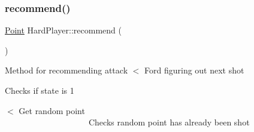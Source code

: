 \subsubsection{\texorpdfstring{recommend()}{recommend()}}
{\footnotesize\ttfamily \mbox{\hyperlink{class_point}{Point}} Hard\+Player\+::recommend (\begin{DoxyParamCaption}{ }\end{DoxyParamCaption})\hspace{0.3cm}{\ttfamily [virtual]}}

Method for recommending attack $<$ Ford figuring out next shot

Checks if state is 1

$<$ Get random point ~\newline
~\newline
~\newline
~\newline
~\newline
~\newline
~\newline
~\newline
~\newline
~\newline
~\newline
~\newline
~\newline
~\newline
~\newline
~\newline
~\newline
~\newline
~\newline
~\newline
~\newline
~\newline
~\newline
~\newline
~\newline
~\newline
~\newline
~\newline
~\newline
~\newline
~\newline
~\newline
~\newline
~\newline
~\newline
~\newline
~\newline
~\newline
~\newline
~\newline
~\newline
~\newline
~\newline
 Checks random point has already been shot

